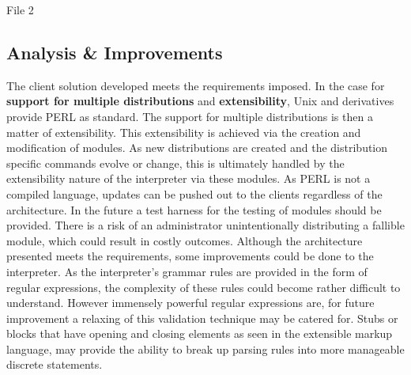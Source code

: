 		\begin{figurehere}
			\inputminted[linenos=true,fontsize=\footnotesize,tabsize=2]{perl}{pages/chapter3/smippets/filter.pl}
			\vspace{-5mm}
			\caption{File 2}
			\label{fig:FilterSimple}
		\end{figurehere}
		

	\vspace{4mm}
	\subsection{Analysis \& Improvements}
	
		The client solution developed meets the requirements imposed.  In the case for \textbf{support for multiple distributions} and \textbf{extensibility},
		Unix and derivatives provide PERL as standard.  The support for multiple distributions is then a matter of extensibility.
		This extensibility is achieved via the creation and modification of modules.  As new distributions are created and the distribution specific commands evolve 
		or change, this is ultimately handled by the extensibility nature of the interpreter via these modules.  
		\newline
		\newline
		As PERL is not a compiled language, updates can be pushed out to the clients regardless of the architecture.  
		In the future a test harness for the testing of modules should be provided.
		There is a risk of an administrator unintentionally distributing a fallible module, which could result in costly outcomes.
		\newline
		\newline
		Although the architecture presented meets the requirements, some improvements could be done to the interpreter.
		As the interpreter's grammar rules are provided in the form of regular expressions, the complexity of these rules
		could become rather difficult to understand.  However immensely powerful regular expressions are, for future improvement a relaxing of 
		this validation technique may be catered for.  Stubs or blocks that have opening and closing elements as seen in the extensible markup language,
		may provide the ability to break up parsing rules into more manageable discrete statements.
		\newline
	
